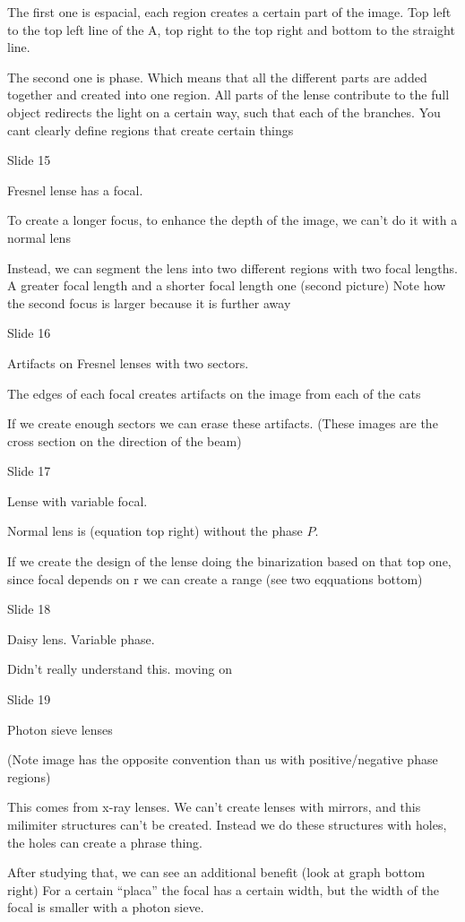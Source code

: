 \documentclass[../main/main.tex]{subfiles}
\begin{document}
The first one is espacial, each region creates a certain part of the image. Top left to the top left line of the A, top right to the top right and bottom to the straight line.

The second one is phase. Which means that all the different parts are added together and created into one region. All parts of the lense contribute to the full object
redirects the light on a certain way, such that each of the branches. You cant clearly define regions that create certain things

Slide 15

Fresnel lense has a focal.

To create a longer focus, to enhance the depth of the image, we can't do it with a normal lens

Instead, we  can segment  the lens into two different regions with two focal lengths. A greater focal length and a shorter focal length one (second picture) Note how the second focus is larger because it is further away

Slide 16

Artifacts on Fresnel lenses with two sectors.

The edges of each focal creates artifacts on the image from each of the cats

If we create enough sectors we can erase these artifacts. (These images are the cross section on the direction of the beam)


Slide 17

Lense with variable focal.

Normal lens is (equation top right) without the phase $P$.

If we create the design of the lense doing the binarization based on that top one, since focal depends on r we can create a range (see two eqquations bottom)

Slide 18


Daisy lens. Variable phase.

Didn't really understand this. moving on

Slide 19

Photon sieve lenses

(Note image has the opposite convention than us with positive/negative phase regions)


This comes from x-ray lenses. We can't create lenses with mirrors, and this milimiter structures can't be created. Instead we do these structures with holes, the holes can create a phrase thing.

After studying that, we can see an additional benefit (look at graph bottom right) For a certain ``placa'' the focal has a certain width, but the width of the focal is smaller with a photon sieve.
\end{document}
